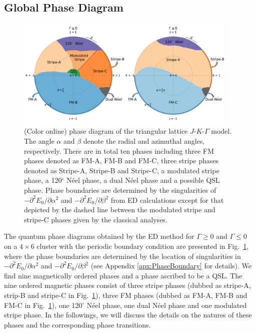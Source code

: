 \documentclass[aps,prb,reprint,amsfonts,amsmath,amssymb,showpacs,groupedaddress,superscriptaddress]{revtex4-1}
\begin{document}
\subsection{\label{subsec:GlobalPhaseDiagram}Global Phase Diagram}

\begin{figure}
    \centering
    \includegraphics[width=0.95\textwidth]{QuantumGlobalPhaseDiagram.pdf}
    \caption{\label{fig:QuantumPhaseDiagram}(Color online)  phase diagram of the triangular lattice $J$-$K$-$\Gamma$ model. The angle $\alpha$ and $\beta$ denote the radial and azimuthal angles, respectively. There are in total ten phases including three FM phases denoted as FM-A, FM-B and FM-C, three stripe phases denoted as Stripe-A, Stripe-B and Stripe-C, a modulated stripe phase, a 120$^\circ$ N\'{e}el phase, a dual N\'{e}el phase and a possible QSL phase. Phase boundaries are determined by the singularities of $-\partial^2E_0/\partial\alpha^2$ and $-\partial^2E_0/\partial\beta^2$ from ED calculations except for that depicted by the dashed line between the modulated stripe and stripe-C phases given by the classical analyses.}
\end{figure}

The  quantum phase diagrams obtained by the ED method for $\Gamma \geq 0$ and $\Gamma \leq 0$ on a $4 \times 6$ cluster with the periodic boundary condition are presented in Fig.~\ref{fig:QuantumPhaseDiagram}, where the phase boundaries are determined by the location of singularities in $-\partial^2E_0/\partial\alpha^2$ and $-\partial^2E_0/\partial\beta^2$ (see Appendix \ref{apx:PhaseBoundary} for details). We find nine magnetically ordered phases and a phase ascribed to be a QSL. The nine ordered magnetic phases consist of three stripe phases (dubbed as stripe-A, strip-B and stripe-C in Fig.~\ref{fig:QuantumPhaseDiagram}), three FM phases (dubbed as FM-A, FM-B and FM-C in Fig.~\ref{fig:QuantumPhaseDiagram}), one 120$^\circ$ N\'{e}el phase, one dual N\'{e}el phase and one modulated stripe phase. In the followings, we will discuss the details on the natures of these phases and the corresponding phase transitions.
\end{document}
